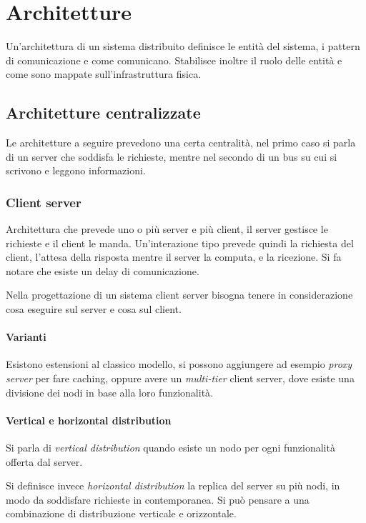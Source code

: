 \section{Architetture}
Un'architettura di un sistema distribuito definisce le entità 
del sistema, i pattern di comunicazione e come comunicano.
Stabilisce inoltre il ruolo delle entità e come sono mappate 
sull'infrastruttura fisica.

\subsection{Architetture centralizzate}
Le architetture a seguire prevedono una certa centralità, nel primo caso 
si parla di un server che soddisfa le richieste, mentre nel secondo 
di un bus su cui si scrivono e leggono informazioni.

\subsubsection{Client server}
Architettura che prevede uno o più server e più client, 
il server gestisce le richieste e il client le manda.
Un'interazione tipo prevede quindi la richiesta del client, 
l'attesa della risposta mentre il server la computa, e la ricezione.
Si fa notare che esiste un delay di comunicazione.

Nella progettazione di un sistema client server bisogna tenere in considerazione
cosa eseguire sul server e cosa sul client.

\paragraph{Varianti}
Esistono estensioni al classico modello, si possono aggiungere ad esempio 
\emph{proxy server}
per fare caching, oppure avere un \emph{multi-tier} client server, dove esiste
una divisione dei nodi in base alla loro funzionalità.

\paragraph{Vertical e horizontal distribution}
Si parla di \emph{vertical distribution} quando esiste un nodo per ogni funzionalità
offerta dal server.

Si definisce invece \emph{horizontal distribution} la replica del 
server su più nodi, in modo da soddisfare richieste in contemporanea.
Si può pensare a una combinazione di distribuzione verticale e orizzontale.

